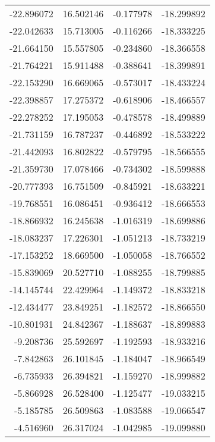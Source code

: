 \begin{tabular}{rrrr}
      -22.896072 &        16.502146 &   -0.177978 & -18.299892 \\
      -22.042633 &        15.713005 &   -0.116266 & -18.333225 \\
      -21.664150 &        15.557805 &   -0.234860 & -18.366558 \\
      -21.764221 &        15.911488 &   -0.388641 & -18.399891 \\
      -22.153290 &        16.669065 &   -0.573017 & -18.433224 \\
      -22.398857 &        17.275372 &   -0.618906 & -18.466557 \\
      -22.278252 &        17.195053 &   -0.478578 & -18.499889 \\
      -21.731159 &        16.787237 &   -0.446892 & -18.533222 \\
      -21.442093 &        16.802822 &   -0.579795 & -18.566555 \\
      -21.359730 &        17.078466 &   -0.734302 & -18.599888 \\
      -20.777393 &        16.751509 &   -0.845921 & -18.633221 \\
      -19.768551 &        16.086451 &   -0.936412 & -18.666553 \\
      -18.866932 &        16.245638 &   -1.016319 & -18.699886 \\
      -18.083237 &        17.226301 &   -1.051213 & -18.733219 \\
      -17.153252 &        18.669500 &   -1.050058 & -18.766552 \\
      -15.839069 &        20.527710 &   -1.088255 & -18.799885 \\
      -14.145744 &        22.429964 &   -1.149372 & -18.833218 \\
      -12.434477 &        23.849251 &   -1.182572 & -18.866550 \\
      -10.801931 &        24.842367 &   -1.188637 & -18.899883 \\
       -9.208736 &        25.592697 &   -1.192593 & -18.933216 \\
       -7.842863 &        26.101845 &   -1.184047 & -18.966549 \\
       -6.735933 &        26.394821 &   -1.159270 & -18.999882 \\
       -5.866928 &        26.528400 &   -1.125477 & -19.033215 \\
       -5.185785 &        26.509863 &   -1.083588 & -19.066547 \\
       -4.516960 &        26.317024 &   -1.042985 & -19.099880 \\

\end{tabular}
